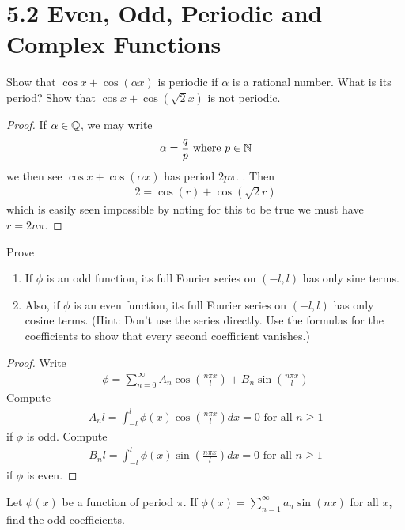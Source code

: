 \documentclass{report}
\begin{document}
\section{5.2 Even, Odd, Periodic and Complex Functions}
\begin{question}{}{}
Show that $\cos x+ \cos (\alpha x)$ is periodic if $\alpha $ is a rational number. What is its period? Show that $\cos x+ \cos (\sqrt{2}x)$ is not periodic. 
\end{question}
\begin{proof}
If $\alpha \in\mathbb{Q}$, we may write 
\begin{align*}
\alpha = \frac{q}{p}\text{ where }p \in\mathbb{N}
\end{align*}
we then see $\cos x+ \cos (\alpha x)$ has period $2p \pi $. . Then 
\begin{align*}
2= \cos (r)+ \cos (\sqrt{2}r )
\end{align*}
which is easily seen impossible by noting for this to be true we must have $r= 2n \pi $. 
\end{proof}
\begin{question}{}{}
Prove 
\begin{enumerate}[label=(\alph*)]
  \item If $\phi$ is an odd function, its full Fourier series on $(-l,l)$ has only sine terms. 
  \item Also, if $\phi$ is an even function, its full Fourier series on $(-l,l)$ has only cosine terms. (Hint: Don't use the series directly. Use the formulas for the coefficients to show that every second coefficient vanishes.)
\end{enumerate}
\end{question}
\begin{proof}
Write 
\begin{align*}
\phi = \sum_{n=0}^{\infty} A_n \cos (\frac{n \pi  x}{l})+ B_n \sin ( \frac{n \pi  x}{l})
\end{align*}
Compute 
\begin{align*}
A_nl=\int_{-l}^{l} \phi (x) \cos (\frac{ n \pi  x}{l})dx=0\text{ for all }n\geq 1
\end{align*}
if $\phi$ is odd. Compute 
\begin{align*}
B_nl = \int_{-l}^{l} \phi (x)\sin ( \frac{n \pi  x}{l})dx=0\text{ for all }n\geq 1
\end{align*}
if $\phi$ is even. 
\end{proof}
\begin{question}{}{}
Let $\phi(x)$ be a function of period $\pi $. If $\phi (x)=\sum_{n=1}^{\infty}a_n \sin (nx)$ for all $x$, find the odd coefficients. 
\end{question}
\end{document}
